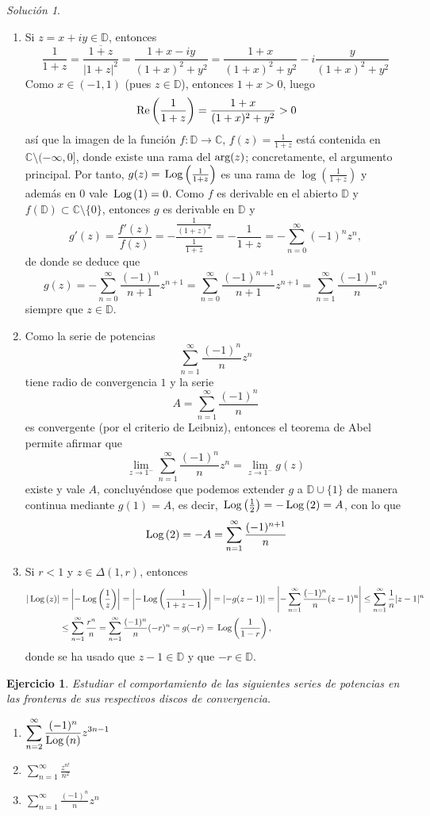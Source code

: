 \documentclass[11pt]{report}
\newcommand{\C}{\mathbb C}
\newcommand{\D}{\mathbb D}
\newcommand{\pars}[1]{\left( #1 \right)} %
\renewcommand{\Re}[1]{\,\textup{Re}\pars{#1}}
\newcommand{\Log}[1]{\,\textup{Log}\pars{#1}}
\newcommand{\serie}[2][0]{\sum_{n=#1}^\infty #2}
\newtheorem{exercise}{Ejercicio}
\theoremstyle{remark}
\newtheorem*{resolution}{Solución}
\begin{document}
\begin{resolution}
\hfill
\begin{enumerate}
    \item Si $z=x+iy \in \D$, entonces
    \[\frac{1}{1+z} = \frac{\overline{1+z}}{|1+z|^2} = \frac{1+x-iy}{(1+x)^2+y^2}= \frac{1+x}{(1+x)^2+y^2}-i\frac{y}{(1+x)^2+y^2}\]
    Como $x \in (-1,1)$ (pues $z \in \D$), entonces $1+x>0$, luego
    \[\Re{\frac{1}{1+z}} = \frac{1+x}{(1+x)^2+y^2} >0 \]
    así que la imagen de la función $f \colon \D \to \C$, $f(z)= \frac{1}{1+z}$ está contenida en $\C \setminus (-\infty,0]$, donde existe una rama del $\textup{arg}(z)$; concretamente, el argumento principal. Por tanto, $g(z)=\Log{\frac{1}{1+z}}$ es una rama de $\log(\frac{1}{1+z})$ y además en $0$ vale $\Log{1} = 0$. Como $f$ es derivable en el abierto $\D$ y $f(\D) \subset \C \setminus \{0\}$, entonces $g$ es derivable en $\D$ y
    \[g'(z)=\frac{f'(z)}{f(z)} = -\frac{\frac{1}{(1+z)^2}}{\frac{1}{1+z}} = -\frac{1}{1+z} = -\serie{(-1)^nz^n},\]
    de donde se deduce que
    \[g(z)=-\serie{\frac{(-1)^n}{n+1}z^{n+1}} = \serie{\frac{(-1)^{n+1}}{n+1}z^{n+1}} = \serie[1]{\frac{(-1)^{n}}{n}z^{n}} \]
    siempre que $z \in \D$.
    \item Como la serie de potencias
    \[\serie[1]{\frac{(-1)^n}{n}z^n}\]
    tiene radio de convergencia $1$ y la serie
    \[A = \serie[1]{\frac{(-1)^n}{n}}\]
    es convergente (por el criterio de Leibniz), entonces el teorema de Abel permite afirmar que
    \[\lim_{z \to 1^-} \serie[1]{\frac{(-1)^n}{n}z^n} = \lim_{z \to 1^-} g(z)\]
    existe y vale $A$, concluyéndose que podemos extender $g$ a $\D \cup \{1\}$ de manera continua mediante $g(1) = A$, es decir, $\Log{\frac{1}{2}} = -\Log{2} = A$, con lo que
    \[\Log{2} = -A = \serie[1]{\frac{(-1)^{n+1}}{n}}\]
    \item Si $r<1$ y $z \in \Delta(1,r)$, entonces
    \[
    \begin{aligned}[t]
    \left|\Log{z}\right| &= \left|-\Log{\frac{1}{z}}\right| = \left|-\Log{\frac{1}{1+z-1}}\right| = \left|-g(z-1)\right| = \left|-\serie[1]\frac{(-1)^n}{n}(z-1)^n\right| \leq \serie[1]\frac{1}{n}|z-1|^n \\
    &\leq \serie[1]\frac{r^n}{n} = \serie[1]{\frac{(-1)^n}{n}(-r)^n} = g(-r) = \Log{\frac{1}{1-r}},
    \end{aligned}
    \]
    donde se ha usado que $z-1 \in \D$ y que $-r \in \D$.
\end{enumerate}
\end{resolution}

\begin{exercise}
Estudiar el comportamiento de las siguientes series de potencias en las fronteras de sus respectivos discos de convergencia.
\begin{enumerate}
    \item $\displaystyle \sum_{n=2}^\infty \frac{(-1)^n}{\textup{Log}\,(n)}z^{3n-1}$
    \item $\displaystyle \sum_{n=1}^\infty \frac{z^{n!}}{n^2}$
    \item $\displaystyle \sum_{n=1}^\infty \frac{(-1)^n}{n}z^n$
\end{enumerate}
\end{exercise}
\end{document}
